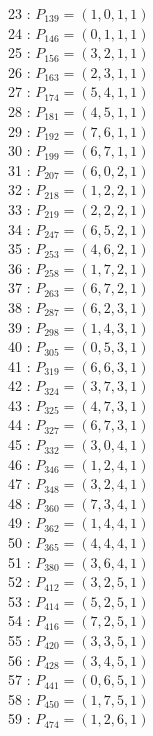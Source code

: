 \documentclass{article}
\begin{document}
{\begin{multicols}{3}
23 : $P_{139}=( 1, 0, 1, 1 )$\\
24 : $P_{146}=( 0, 1, 1, 1 )$\\
25 : $P_{156}=( 3, 2, 1, 1 )$\\
26 : $P_{163}=( 2, 3, 1, 1 )$\\
27 : $P_{174}=( 5, 4, 1, 1 )$\\
28 : $P_{181}=( 4, 5, 1, 1 )$\\
29 : $P_{192}=( 7, 6, 1, 1 )$\\
30 : $P_{199}=( 6, 7, 1, 1 )$\\
31 : $P_{207}=( 6, 0, 2, 1 )$\\
32 : $P_{218}=( 1, 2, 2, 1 )$\\
33 : $P_{219}=( 2, 2, 2, 1 )$\\
34 : $P_{247}=( 6, 5, 2, 1 )$\\
35 : $P_{253}=( 4, 6, 2, 1 )$\\
36 : $P_{258}=( 1, 7, 2, 1 )$\\
37 : $P_{263}=( 6, 7, 2, 1 )$\\
38 : $P_{287}=( 6, 2, 3, 1 )$\\
39 : $P_{298}=( 1, 4, 3, 1 )$\\
40 : $P_{305}=( 0, 5, 3, 1 )$\\
41 : $P_{319}=( 6, 6, 3, 1 )$\\
42 : $P_{324}=( 3, 7, 3, 1 )$\\
43 : $P_{325}=( 4, 7, 3, 1 )$\\
44 : $P_{327}=( 6, 7, 3, 1 )$\\
45 : $P_{332}=( 3, 0, 4, 1 )$\\
46 : $P_{346}=( 1, 2, 4, 1 )$\\
47 : $P_{348}=( 3, 2, 4, 1 )$\\
48 : $P_{360}=( 7, 3, 4, 1 )$\\
49 : $P_{362}=( 1, 4, 4, 1 )$\\
50 : $P_{365}=( 4, 4, 4, 1 )$\\
51 : $P_{380}=( 3, 6, 4, 1 )$\\
52 : $P_{412}=( 3, 2, 5, 1 )$\\
53 : $P_{414}=( 5, 2, 5, 1 )$\\
54 : $P_{416}=( 7, 2, 5, 1 )$\\
55 : $P_{420}=( 3, 3, 5, 1 )$\\
56 : $P_{428}=( 3, 4, 5, 1 )$\\
57 : $P_{441}=( 0, 6, 5, 1 )$\\
58 : $P_{450}=( 1, 7, 5, 1 )$\\
59 : $P_{474}=( 1, 2, 6, 1 )$\\

\end{multicols}}
\end{document}
